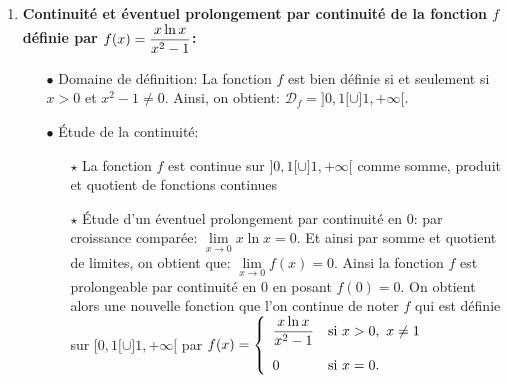 \documentclass[a4paper, 11pt,reqno]{article}
\begin{document}
\begin{correction}
\begin{enumerate}
\begin{itemize}
\begin{itemize}
				            \item[$\star$] \'Etude d'un \'eventuel prolongement par continuit\'e en 1: on a:
				                  $f(x)=\ln{\left( \ddp\frac{\sqrt{x}-1}{x-1}\right)}=\ln{\left( \ddp\frac{1}{\sqrt{x}+1}\right)}$. Ainsi $\lim\limits_{x\to 1} f(x)=-\ln{2}$ par propri\'et\'es sur les somme, quotient et compos\'ee de limites. Ainsi la fonction $f$ est bien prolongeable par continuit\'e en 1 en posant $f(1)=-\ln{2}$.
			            \end{itemize}
			            On obtient une fonction que l'on continue de noter $f$ et qui est alors d\'efinie sur $\lbrack 1,+\infty\lbrack$ par
			            $f(x)=\left\lbrace \begin{array}{ll}  \ln{(\sqrt{x}-1)}-\ln{(x-1)} & \hbox{si}\ x>1\vsec\\ -\ln{(2)} & \hbox{si}\ x=1.  \end{array}\right.$ Cette fonction est alors bien continue sur $\lbrack 1,+\infty\lbrack$ car elle est continue sur $\rbrack 1,+\infty\lbrack$ comme compos\'ee et somme de fonctions continues et elle est continue en 1 par prolongement.
		      \end{itemize}
		\item \textbf{Continuit\'e et \'eventuel prolongement par continuit\'e de la fonction $f$ d\'efinie par $f(x)=\displaystyle\frac{x\ln{x}}{x^2-1}$:}
		      \begin{itemize}
			      \item[$\bullet$] Domaine de d\'efinition: La fonction $f$ est bien d\'efinie si et seulement si $x>0$ et $x^2-1\not= 0$. Ainsi, on obtient: $\mathcal{D}_{f}=\rbrack 0,1\lbrack\cup\rbrack 1,+\infty\lbrack$.
			      \item[$\bullet$] \'Etude de la continuit\'e:
			            \begin{itemize}
				            \item[$\star$] La fonction $f$ est continue sur $\rbrack 0,1\lbrack\cup\rbrack 1,+\infty\lbrack$ comme somme, produit et quotient de fonctions continues
				            \item[$\star$] \'Etude d'un \'eventuel prolongement par continuit\'e en 0: par croissance compar\'ee: $\lim\limits_{x\to 0} x\ln{x}=0$. Et ainsi par somme et quotient de limites, on obtient que: $\lim\limits_{x\to 0} f(x)=0$. Ainsi la fonction $f$ est prolongeable par continuit\'e en 0 en posant $f(0)=0$. On obtient alors une nouvelle fonction que l'on continue de noter $f$ qui est d\'efinie sur $\lbrack 0,1\lbrack\cup\rbrack 1,+\infty\lbrack$ par $f(x)=\left\lbrace \begin{array}{ll}  \ddp\frac{x\ln{x}}{x^2-1} & \hbox{si}\ x>0,\ x\not= 1\vsec\\ 0 & \hbox{si}\ x=0.  \end{array}\right.$

\end{itemize}
\end{itemize}
\end{enumerate}
\end{correction}
\end{document}
